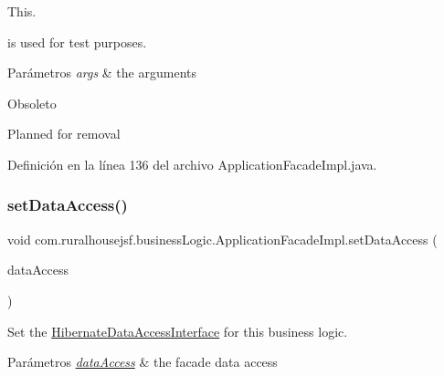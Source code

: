 This. 


\begin{DoxyCode}{0}
\end{DoxyCode}
 is used for test purposes.


\begin{DoxyParams}{Parámetros}
{\em args} & the arguments\\
\hline
\end{DoxyParams}
\begin{DoxyRefDesc}{Obsoleto}
\item[\mbox{\hyperlink{deprecated__deprecated000001}{Obsoleto}}]Planned for removal \end{DoxyRefDesc}


Definición en la línea 136 del archivo Application\+Facade\+Impl.\+java.

\mbox{\label{classcom_1_1ruralhousejsf_1_1business_logic_1_1_application_facade_impl_a78fc6968b9fec7aa475b322463b6bd92}} 
\subsubsection{\texorpdfstring{setDataAccess()}{setDataAccess()}}
{\footnotesize\ttfamily void com.\+ruralhousejsf.\+business\+Logic.\+Application\+Facade\+Impl.\+set\+Data\+Access (\begin{DoxyParamCaption}\item[{\mbox{\hyperlink{interfacecom_1_1ruralhousejsf_1_1data_access_1_1_hibernate_data_access_interface}{Hibernate\+Data\+Access\+Interface}}}]{data\+Access }\end{DoxyParamCaption})}



Set the \mbox{\hyperlink{}{Hibernate\+Data\+Access\+Interface}} for this business logic. 


\begin{DoxyParams}{Parámetros}
{\em \mbox{\hyperlink{namespacecom_1_1ruralhousejsf_1_1data_access}{data\+Access}}} & the facade data access \\
\hline
\end{DoxyParams}


